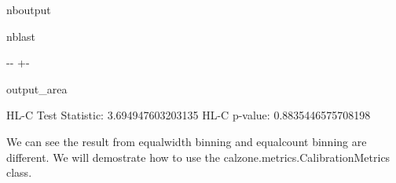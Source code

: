 \documentclass[letterpaper,10pt,english]{sphinxmanual}
\begin{document}
\begin{sphinxuseclass}{nboutput}
\begin{sphinxuseclass}{nblast}
{

\kern-\sphinxverbatimsmallskipamount\kern-\baselineskip
\kern+\FrameHeightAdjust\kern-\fboxrule
\vspace{\nbsphinxcodecellspacing}

\begin{sphinxuseclass}{output_area}
\begin{sphinxuseclass}{}


\begin{sphinxVerbatim}[commandchars=\\\{\}]
HL-C Test Statistic:  3.694947603203135
HL-C p-value:  0.8835446575708198
\end{sphinxVerbatim}



\end{sphinxuseclass}
\end{sphinxuseclass}
}

\end{sphinxuseclass}
\end{sphinxuseclass}
\sphinxAtStartPar
We can see the result from equal\sphinxhyphen{}width binning and equal\sphinxhyphen{}count binning are different. We will demostrate how to use the calzone.metrics.CalibrationMetrics class.
\end{document}
